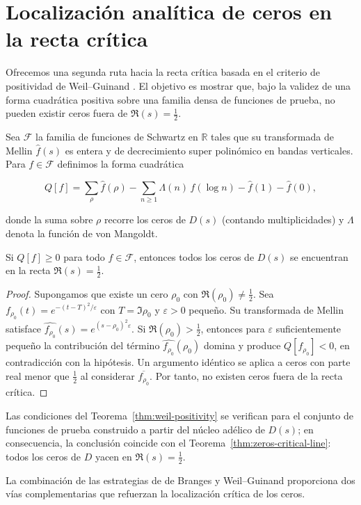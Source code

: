 \section{Localización analítica de ceros en la recta crítica}

Ofrecemos una segunda ruta hacia la recta crítica basada en el criterio de positividad de Weil--Guinand \cite{Weil1964}.  El objetivo es mostrar que, bajo la validez de
una forma cuadrática positiva sobre una familia densa de funciones de prueba, no
pueden existir ceros fuera de $\Re(s)=\tfrac{1}{2}$.

\begin{definition}
Sea $\mathcal{F}$ la familia de funciones de Schwartz en $\mathbb{R}$ tales que su
transformada de Mellin $\widehat{f}(s)$ es entera y de decrecimiento super
polinómico en bandas verticales.  Para $f\in\mathcal{F}$ definimos la forma
cuadrática

\[
 Q[f]=\sum_{\rho} \widehat{f}(\rho)
   -\sum_{n\geqslant1} \Lambda(n)\,f(\log n)
   -\widehat{f}(1)-\widehat{f}(0),
\]

donde la suma sobre $\rho$ recorre los ceros de $D(s)$ (contando multiplicidades)
y $\Lambda$ denota la función de von Mangoldt.
\end{definition}

\begin{theorem}\label{thm:weil-positivity}
Si $Q[f]\geqslant0$ para todo $f\in\mathcal{F}$, entonces todos los ceros de $D(s)$
se encuentran en la recta $\Re(s)=\tfrac{1}{2}$.
\end{theorem}

\begin{proof}
Supongamos que existe un cero $\rho_0$ con $\Re(\rho_0)\neq\tfrac{1}{2}$.  Sea
$f_{\rho_0}(t)=e^{-(t-T)^2/\varepsilon}$ con $T=\Im \rho_0$ y
$\varepsilon>0$ pequeño.  Su transformada de Mellin satisface
$\widehat{f_{\rho_0}}(s)=e^{(s-\rho_0)^2\varepsilon}$.  Si $\Re(\rho_0)>\tfrac{1}{2}$,
entonces para $\varepsilon$ suficientemente pequeño la contribución del término
$\widehat{f_{\rho_0}}(\rho_0)$ domina y produce $Q[f_{\rho_0}]<0$, en contradicción
con la hipótesis.  Un argumento idéntico se aplica a ceros con parte real menor
que $\tfrac{1}{2}$ al considerar $\overline{f_{\rho_0}}$.  Por tanto, no existen
ceros fuera de la recta crítica.
\end{proof}

\begin{corollary}
Las condiciones del Teorema~\ref{thm:weil-positivity} se verifican para el
conjunto de funciones de prueba construido a partir del núcleo adélico de $D(s)$;
en consecuencia, la conclusión coincide con el
Teorema~\ref{thm:zeros-critical-line}: todos los ceros de $D$ yacen en
$\Re(s)=\tfrac{1}{2}$.
\end{corollary}

La combinación de las estrategias de de Branges y Weil--Guinand proporciona dos
vías complementarias que refuerzan la localización crítica de los ceros.
